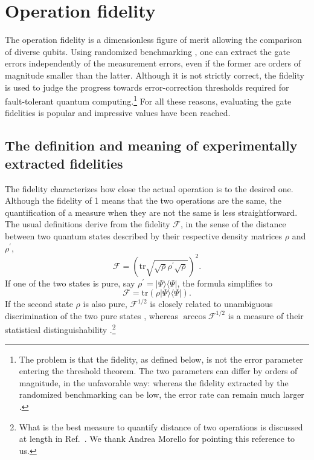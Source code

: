 \documentclass[aps, prx, showpacs, twocolumn, superscriptaddress, notitlepage, longbibliography, floatfix, nofootinbib]{revtex4-2}
\begin{document}
\section{Operation fidelity}


The operation fidelity is a dimensionless figure of merit allowing the comparison of diverse qubits. Using randomized benchmarking \cite{epstein_investigating_2014}, one can extract the gate errors independently of the measurement errors, even if the former are orders of magnitude smaller than the latter. Although it is not strictly correct, the fidelity is used to judge the progress towards error-correction thresholds required for fault-tolerant quantum computing.\footnote{The problem is that the fidelity, as defined below, is not the error parameter entering the threshold theorem. The two parameters can differ by orders of magnitude, in the unfavorable way: whereas the fidelity extracted by the randomized benchmarking can be low, the error rate can remain much larger \cite{sanders_bounding_2015,blume-kohout_demonstration_2017}. } For all these reasons, evaluating the gate fidelities is popular and impressive values have been reached. 

\subsection{The definition and meaning of experimentally extracted fidelities}

\label{sec:fidelityDefinition}

The fidelity characterizes how close the actual operation is to the desired one. Although the fidelity of 1 means that the two operations are the same, the quantification of a measure when they are not the same is less straightforward. The usual definitions derive from the fidelity $\mathcal{F}$, in the sense of the distance between two quantum states described by their respective density matrices $\rho$ and $\rho^\prime$,
\begin{equation}
\mathcal{F} = \left( \mathrm{tr}\sqrt{\sqrt{\rho}\rho^\prime \sqrt{\rho}} \right)^2.
\label{eq:fidelity1}
\end{equation}
If one of the two states is pure, say $\rho^\prime = |\Psi\rangle \langle \Psi|$, the formula simplifies to
\begin{equation}
\mathcal{F} = \mathrm{tr} \left(  \rho |\Psi\rangle\langle \Psi| \right).
\label{eq:fidelity2}
\end{equation}
If the second state $\rho$ is also pure, $\mathcal{F}^{1/2}$ is closely related to unambiguous discrimination of the two pure states \cite{heinosaari_guide_2008}, whereas $\arccos \mathcal{F}^{1/2}$ is a measure of their statistical distinguishability \cite{wootters_statistical_1981}.\footnote{What is the best measure to quantify distance of two operations is discussed at length in Ref.~\cite{gilchrist_distance_2005}. We thank Andrea Morello for pointing this reference to us.}
\end{document}
